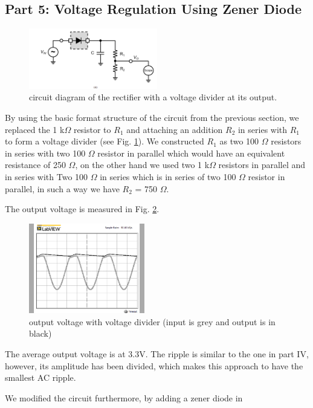 \documentclass[letterpaper, 10 pt, conference]{ieeeconf}  %
\begin{document}
\subsection{Part 5: Voltage Regulation Using Zener Diode}
\begin{figure}[!hb]
  \centering
  \includegraphics[width=0.5\textwidth]{images/5_1.png}
  \caption{circuit diagram of the rectifier with a voltage divider at its output.}
  \label{fig:5.1}
\end{figure}
By using the basic format structure of the circuit from the previous section,
we replaced the 1 k$\Omega$ resistor to $R_{1}$ and attaching an addition
$R_{2}$ in series with $R_{1}$ to form a voltage divider (see Fig. \ref{fig:5.1}).
We constructed $R_{1}$ as two 100 $\Omega$ resistors in series with two 100
$\Omega$ resistor in parallel which would have an equivalent resistance of
250 $\Omega$, on the other hand we used two 1 k$\Omega$ resistors in parallel
and in series with Two 100 $\Omega$ in series which is in series of two 100
$\Omega$ resistor in parallel, in such a way we have $R_{2}$ = 750 $\Omega$.
\par The output voltage is measured in Fig. \ref{fig:5.2}.
\begin{figure}[h]
  \centering
  \includegraphics[width=0.45\textwidth]{images/5_2.png}
  \caption{output voltage with voltage divider (input is grey and output is in black)}
  \label{fig:5.2}
\end{figure}
\par The average output voltage is at 3.3V.
The ripple is similar to the one in part IV, however, its amplitude has been divided,
which makes this approach to have the smallest AC ripple.
\newpage
\par We modified the circuit furthermore, by adding a zener diode in
\end{document}

